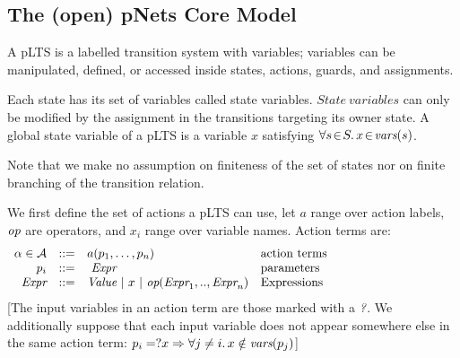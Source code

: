\documentclass{lncs/llncs}
\newcommand{\QIN}[1]{\textcolor{airforceblue}{#1}}
\def\AlgA{\mathcal{A}}
\begin{document}
\subsection{The (open) pNets Core Model}
\label{section:pNets}


A pLTS is a labelled transition system with variables; variables can be
manipulated, defined, or accessed inside states, actions, guards, and
assignments. 

\QIN{
Each state has its set of variables called state variables.
$State\ variables$ can only be modified by the assignment in the transitions targeting its owner state. 
A global state variable of a pLTS is a variable $x$ satisfying $\forall s\!\in\! S .\, x\!\in\! \vars(s)$.
}

Note that we make no assumption on finiteness of the set of states nor
on finite branching of the transition relation.

We first define the set of actions a pLTS can use, let $a$
range over action labels, $\symb{op}$ are operators, and $x_i$ range over
variable names. Action terms are:
\[
\begin{array}[l]{rcl@{\quad}p{5.5cm}}
  \alpha\in\AlgA&::=&a(p_1,\ldots,p_n)&\text{action terms}\\
  p_i&::=& ~\symb{Expr}&\text{parameters}\\
  \symb{Expr}&::=& \symb{Value}~|~x~|~\symb{op}(\symb{Expr}_1,..,\symb{Expr}_n)&\text{Expressions}
\end{array}
\]
\QIN{
[The input variables in an action term are those marked with a
$\symb{?}$.
We additionally suppose that each input variable does not
appear somewhere else in the same action term:
$p_i=?x\Rightarrow\forall j\neq i.\, x\notin \vars(p_j)$]}
\end{document}

